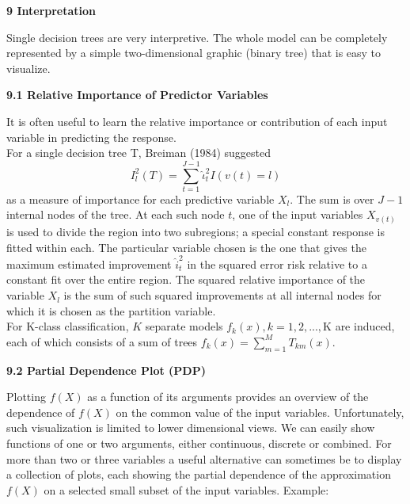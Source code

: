 \documentclass[12pt, letterpaper, twoside]{article}
\begin{document}
\begin{center}
\textbf{\large{9 Interpretation}}
\end{center}
\hspace*{4ex}Single decision trees are very interpretive. The whole model can be completely represented by a simple two-dimensional graphic (binary tree) that is easy to visualize.
\begin{center}
\textbf{\large{9.1 Relative Importance of Predictor Variables}}
\end{center}
\hspace*{4ex} It is often useful to learn the relative importance or contribution of each input variable in predicting the response.\\
\hspace*{4ex}For a single decision tree T, Breiman (1984) suggested
\begin{equation*}
I_l^2(T)=\sum_{t=1}^{J-1} \hat{\iota}_t^2 I(v(t)=l)
\end{equation*}
as a measure of importance for each predictive variable $X_l$. The sum is over $J-1$ internal nodes of the tree. At each such node $t$, one of the input variables $X_{v(t)}$ is used to divide the region into two subregions; a special constant response is fitted within each. The particular variable chosen is the one that gives the maximum estimated improvement $\hat{i}_t^2$ in the squared error risk relative to a constant fit over the entire region. The squared relative importance of the variable $X_l$ is the sum of such squared improvements at all internal nodes for which it is chosen as the partition variable.\\
\hspace*{4ex} For K-class classification, $K$ separate models $f_k(x),k=1,2,...,$K are induced, each of which consists of a sum of trees $f_k(x)=\sum_{m=1}^M T_{km}(x)$.\\
\begin{center}
\textbf{\large{9.2 Partial Dependence Plot (PDP)}}
\end{center}
\hspace*{4ex}Plotting $f(X)$ as a function of its arguments provides an overview of the dependence of $f(X)$ on the common value of the input variables. Unfortunately, such visualization is limited to lower dimensional views. We can easily show functions of one or two arguments, either continuous, discrete or combined. For more than two or three variables a useful alternative can sometimes be to display a collection of plots, each showing the partial dependence of the approximation $f(X)$ on a selected small subset of the input variables. Example:
\end{document}
